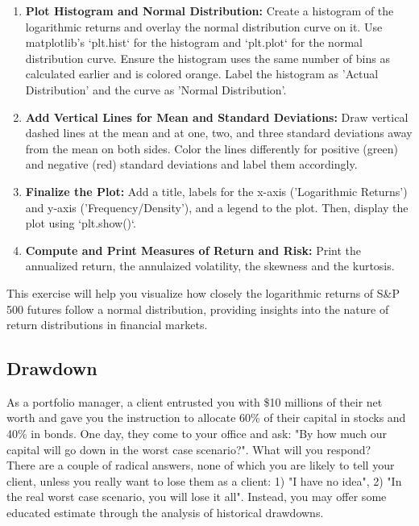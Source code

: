 \documentclass{article}
\begin{document}
\begin{enumerate}
    \item \textbf{Plot Histogram and Normal Distribution:}
    Create a histogram of the logarithmic returns and overlay the normal distribution curve on it. Use matplotlib's `plt.hist` for the histogram and `plt.plot` for the normal distribution curve. Ensure the histogram uses the same number of bins as calculated earlier and is colored orange. Label the histogram as 'Actual Distribution' and the curve as 'Normal Distribution'.

    \item \textbf{Add Vertical Lines for Mean and Standard Deviations:}
    Draw vertical dashed lines at the mean and at one, two, and three standard deviations away from the mean on both sides. Color the lines differently for positive (green) and negative (red) standard deviations and label them accordingly.

    \item \textbf{Finalize the Plot:}
    Add a title, labels for the x-axis ('Logarithmic Returns') and y-axis ('Frequency/Density'), and a legend to the plot. Then, display the plot using `plt.show()`.

    \item \textbf{Compute and Print Measures of Return and Risk:}
    Print the annualized return, the annulaized volatility, the skewness and the kurtosis.
    
\end{enumerate}

This exercise will help you visualize how closely the logarithmic returns of S\&P 500 futures follow a normal distribution, providing insights into the nature of return distributions in financial markets.


\clearpage

\subsection{Drawdown}

As a portfolio manager, a client entrusted you with \$10 millions of their net worth and gave you the instruction to allocate 60\% of their capital in stocks and 40\% in bonds. One day, they come to your office and ask: "By how much our capital will go down in the worst case scenario?". What will you respond? \\

There are a couple of radical answers, none of which you are likely to tell your client, unless you really want to lose them as a client: 1) "I have no idea", 2) "In the real worst case scenario, you will lose it all". Instead, you may offer some educated estimate through the analysis of historical drawdowns. \\
\end{document}
